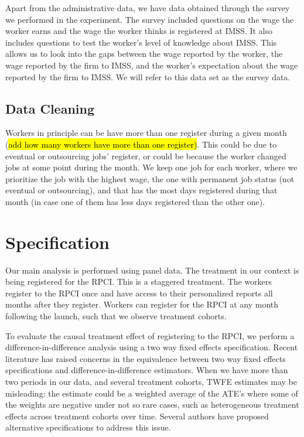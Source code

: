 \documentclass[oneside,11pt]{article}
\begin{document}
Apart from the administrative data, we have data obtained through the survey we performed in the experiment. The survey included questions on the wage the worker earns and the wage the worker thinks is registered at IMSS. It also includes questions to test the worker's level of knowledge about IMSS. This allows us to look into the gaps between the wage reported by the worker, the wage reported by the firm to IMSS, and the worker's expectation about the wage reported by the firm to IMSS. We will refer to this data set as the survey data.

\subsection{Data Cleaning}

Workers in principle can be have more than one register during a given month (\hl{add how many workers have more than one register)}. This could be due to eventual or outsourcing jobs' register, or could be because the worker changed jobs at some point during the month. We keep one job for each worker, where we prioritize the job with the highest wage, the one with permanent job status (not eventual or outsourcing), and that has the most days registered during that month (in case one of them has less days registered than the other one).

\section{Specification}

Our main analysis is performed using panel data. The treatment in our context is being registered for the RPCI. This is a staggered treatment. The workers register to the RPCI once and have access to their personalized reports all months after they register. Workers can register for the RPCI at any month following the launch, such that we observe treatment cohorts.

To evaluate the causal treatment effect of registering to the RPCI, we perform a difference-in-difference analysis using a two way fixed effects specification. Recent literature has raised concerns in the equivalence between two way fixed effects specifications and difference-in-difference estimators. When we have more than two periods in our data, and several treatment cohorts, TWFE estimates may be misleading: the estimate could be a weighted average of the ATE's where some of the weights are negative under not so rare cases, such as heterogeneous treatment effects across treatment cohorts over time. Several authors have proposed alternative specifications to address this issue. 
\end{document}
